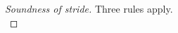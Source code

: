 \begin{proof}[Soundness of stride]
 {
Three rules apply.\\
   {
%
%
  }
   { %
%
%
   }
   {
%
%
%
   }
 }


\end{proof}
